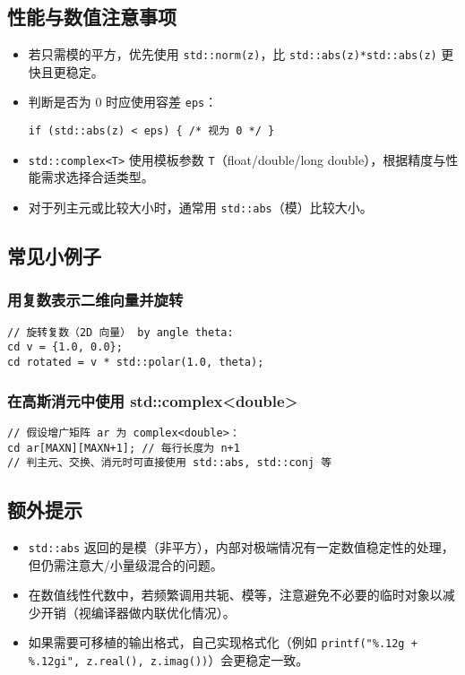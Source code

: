 \documentclass[titlepage, a4paper]{report}
\begin{document}
\subsection*{性能与数值注意事项}
\begin{itemize}
  \item 若只需模的平方，优先使用 \verb|std::norm(z)|，比 \verb|std::abs(z)*std::abs(z)| 更快且更稳定。
  \item 判断是否为 0 时应使用容差 \verb|eps|：
\begin{verbatim}
if (std::abs(z) < eps) { /* 视为 0 */ }
\end{verbatim}
  \item \verb|std::complex<T>| 使用模板参数 \verb|T|（float/double/long double），根据精度与性能需求选择合适类型。
  \item 对于列主元或比较大小时，通常用 \verb|std::abs|（模）比较大小。
\end{itemize}

\subsection*{常见小例子}
\subsubsection*{用复数表示二维向量并旋转}
\begin{verbatim}
// 旋转复数（2D 向量） by angle theta:
cd v = {1.0, 0.0};
cd rotated = v * std::polar(1.0, theta);
\end{verbatim}

\subsubsection*{在高斯消元中使用 std::complex<double>}
\begin{verbatim}
// 假设增广矩阵 ar 为 complex<double>：
cd ar[MAXN][MAXN+1]; // 每行长度为 n+1
// 判主元、交换、消元时可直接使用 std::abs, std::conj 等
\end{verbatim}

\subsection*{额外提示}
\begin{itemize}
  \item \texttt{std::abs} 返回的是模（非平方），内部对极端情况有一定数值稳定性的处理，但仍需注意大/小量级混合的问题。
  \item 在数值线性代数中，若频繁调用共轭、模等，注意避免不必要的临时对象以减少开销（视编译器做内联优化情况）。
  \item 如果需要可移植的输出格式，自己实现格式化（例如 \verb|printf("%.12g + %.12gi", z.real(), z.imag())|）会更稳定一致。
\end{itemize}
\end{document}

